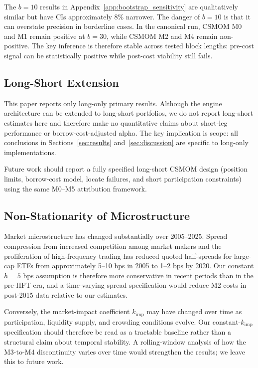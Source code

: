 \documentclass[12pt]{article}
\newcommand{\kimp}{k_{\mathrm{imp}}}
\begin{document}
The $b = 10$ results in Appendix~\ref{app:bootstrap_sensitivity}
are qualitatively similar but have CIs approximately 8\% narrower.
The danger of $b = 10$ is that it can overstate precision in borderline
cases. In the canonical run, CSMOM M0 and M1 remain positive at
$b = 30$, while CSMOM M2 and M4 remain non-positive. The key inference
is therefore stable across tested block lengths: pre-cost signal can be
statistically positive while post-cost viability still fails.

\subsection{Long-Short Extension}
\label{sec:longshort}

This paper reports only long-only primary results. Although the engine
architecture can be extended to long-short portfolios, we do not report
long-short estimates here and therefore make no quantitative claims
about short-leg performance or borrow-cost-adjusted alpha. The key
implication is scope: all conclusions in Sections~\ref{sec:results}
and~\ref{sec:discussion} are specific to long-only implementations.

Future work should report a fully specified long-short CSMOM design
(position limits, borrow-cost model, locate failures, and short
participation constraints) using the same M0--M5 attribution framework.

\subsection{Non-Stationarity of Microstructure}

Market microstructure has changed substantially over 2005--2025.
Spread compression from increased competition among market makers
and the proliferation of high-frequency trading has reduced quoted
half-spreads for large-cap ETFs from approximately 5--10 bps in
2005 to 1--2 bps by 2020. Our constant $h = 5$ bps assumption is
therefore more conservative in recent periods than in the
pre-HFT era, and a time-varying spread specification would reduce
M2 costs in post-2015 data relative to our estimates.

Conversely, the market-impact coefficient $\kimp$ may have changed
over time as participation, liquidity supply, and crowding conditions
evolve. Our constant-$\kimp$ specification should therefore be read as
a tractable baseline rather than a structural claim about temporal
stability.
A rolling-window analysis of how the M3-to-M4 discontinuity varies
over time would strengthen the results; we leave this to future work.
\end{document}

